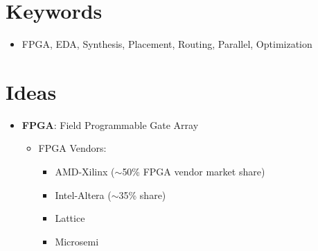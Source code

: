 \documentclass{article}
\begin{document}
\section{Keywords}
\begin{itemize}
    \item FPGA, EDA, Synthesis, Placement, Routing, Parallel, Optimization
\end{itemize}

\section{Ideas}
\begin{itemize}[label={\textbullet}, left=0.25cm]
    \item \textbf{FPGA}: Field Programmable Gate Array
    \begin{itemize}[label={--}, left=0.25cm]
        \item FPGA Vendors:
        \begin{itemize}[label={$\cdot$}, left=0.25cm]
            \item AMD-Xilinx ($\sim$50\% FPGA vendor market share)
            \item Intel-Altera ($\sim$35\% share)
            \item Lattice
            \item Microsemi
        \end{itemize}
    \end{itemize}


\end{itemize}
\end{document}
